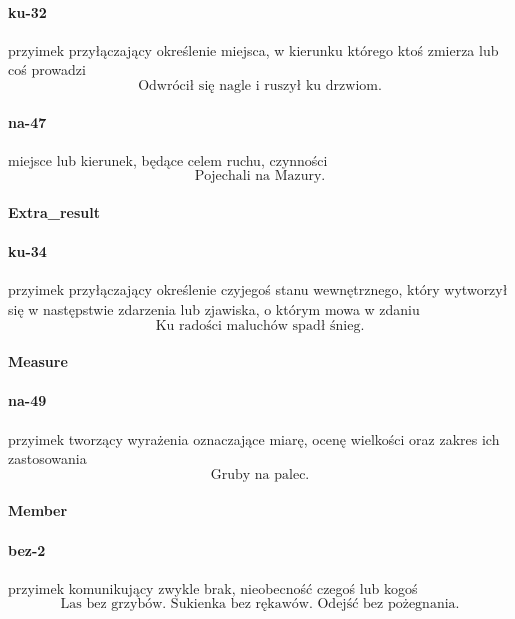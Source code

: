 \documentclass[a4paper, 12pt]{article}
\theoremstyle{remark}
\begin{document}
\paragraph{ku-32} \label{prep-32}	przyimek przyłączający określenie miejsca, w kierunku którego ktoś zmierza lub coś prowadzi
\begin{equation}
\text{Odwrócił się nagle i ruszył ku drzwiom.}
\end{equation}
\paragraph{na-47} \label{prep-47}	miejsce lub kierunek, będące celem ruchu, czynności
\begin{equation}
\text{Pojechali na Mazury.}
\end{equation}

\paragraph{Extra\_result} %
\label{sub:manner}
\paragraph{ku-34} \label{prep-34}	przyimek przyłączający określenie czyjegoś stanu wewnętrznego, który wytworzył się w następstwie zdarzenia lub zjawiska, o którym mowa w zdaniu
\begin{equation}
\text{Ku radości maluchów spadł śnieg.}
\end{equation}

\paragraph{Measure} %
\label{sub:measure}
\paragraph{na-49} \label{prep-49}	przyimek tworzący wyrażenia oznaczające miarę, ocenę wielkości oraz zakres ich zastosowania
\begin{equation}
\text{Gruby na palec.}
\end{equation}

\paragraph{Member} %
\label{sub:member}
\paragraph{bez-2} \label{prep-2}	przyimek komunikujący zwykle brak, nieobecność czegoś lub kogoś
\begin{equation}
\text{Las bez grzybów. Sukienka bez rękawów. Odejść bez pożegnania.}
\end{equation}
\end{document}
